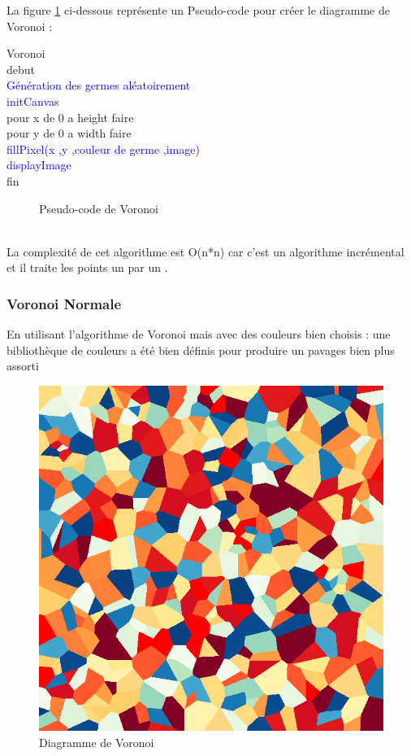 \documentclass[a4paper,10pt]{article}
\begin{document}
La figure \ref{pseudocodeVor} ci-dessous représente un Pseudo-code pour créer le diagramme de Voronoi :
\vspace{0cm}\\
\begin{ttfamily}
\indent Voronoi \\
\indent debut\\
\indent\indent \textcolor{blue}{Génération des germes aléatoirement }\\
\indent\indent \textcolor{blue}{initCanvas }\\
\indent\indent pour x de 0 a height  faire \\
\indent\indent\indent pour y de 0 a width  faire \\
\indent\indent \indent \textcolor{blue}{fillPixel(x ,y ,couleur de germe ,image)}\\
\indent\indent \textcolor{blue}{displayImage} \\
\indent fin
\end{ttfamily}
\begin{figure}[h]
\caption{Pseudo-code de Voronoi}
\label{pseudocodeVor}
\end{figure}\\
La complexité de cet algorithme est O(n*n) car c'est un algorithme incrémental et il traite les points un par un .
\subsubsection{Voronoi Normale}
En utilisant l'algorithme de Voronoi mais avec des couleurs bien choisis :
une bibliothèque de couleurs a été bien définis pour produire un pavages bien plus assorti 

\begin{figure}[h]
    \centering
    \includegraphics[scale=0.3]{Vor.png}
    \caption{Diagramme de Voronoi}
\end{figure}
\end{document}
